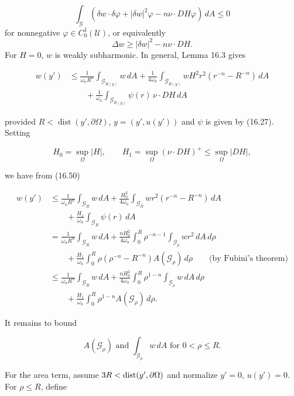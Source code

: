 \[
\tag{16.48}
\int_\mathcal G(\delta w\cdot\delta\varphi+|\delta w|^2\varphi
-n\nu\cdot DH\varphi)\,dA\le0
\]
for nonnegative $\varphi\in C_0^1(\mathcal U)$, or equivalently
\[
\tag{16.49}
\Delta w\ge|\delta w|^2-n\nu\cdot DH.
\]
For $H=0$, $w$ is weakly subharmonic.  In general, Lemma 16.3 gives

\begin{align*}
w(y') &\leq \frac{1}{\omega_n R^n} \int_{\mathcal{G}_{R(y)}} w\, dA + \frac{1}{4\omega_n} \int_{\mathcal{G}_{R(y)}} w H^2 r^{2}(r^{-n} - R^{-n})\, dA \tag{16.50}\\
&\qquad + \frac{1}{\omega_n} \int_{\mathcal{G}_{R(y)}} \psi(r)\, \nu \cdot DH\, dA
\end{align*}

provided $R < \operatorname{dist}(y', \partial\Omega)$, $y = (y', u(y'))$ and $\psi$ is given by (16.27). Setting

\begin{equation}\tag{16.51}
H_0 = \sup_{\Omega} |H|,\qquad
H_1 = \sup_{\Omega} (\nu \cdot DH)^+ \leq \sup_{\Omega} |DH|,
\end{equation}

we have from (16.50)

\begin{align*}
w(y') &\leq \frac{1}{\omega_n R^n} \int_{\mathcal{G}_R} w\, dA + \frac{H_0^2}{4\omega_n} \int_{\mathcal{G}_R} w r^2(r^{-n} - R^{-n})\, dA \\
&\qquad + \frac{H_1}{\omega_n} \int_{\mathcal{G}_R} \psi(r)\, dA \\
&= \frac{1}{\omega_n R^n} \int_{\mathcal{G}_R} w\, dA + \frac{n H_0^2}{4\omega_n} \int_0^R \rho^{-n-1} \int_{\mathcal{G}_\rho} w r^2\, dA\, d\rho \\
&\qquad + \frac{H_1}{\omega_n} \int_0^R \rho(\rho^{-n} - R^{-n}) A(\mathcal{G}_\rho)\, d\rho \qquad \text{(by Fubini's theorem)} \tag{16.52}\\
&\leq \frac{1}{\omega_n R^n} \int_{\mathcal{G}_R} w\, dA + \frac{n H_0^2}{4\omega_n} \int_0^R \rho^{1-n} \int_{\mathcal{G}_\rho} w\, dA\, d\rho \\
&\qquad + \frac{H_1}{\omega_n} \int_0^R \rho^{1-n} A(\mathcal{G}_\rho)\, d\rho.
\end{align*}

It remains to bound

\[
A(\mathcal{G}_\rho) \text{ and } \int_{\mathcal{G}_\rho} w\, dA \text{ for } 0 < \rho \leq R.
\]



For the area term, assume $3R<\operatorname{dist}(y',\partial\Omega)$ and normalize
$y'=0$, $u(y')=0$. For $\rho\le R$, define

